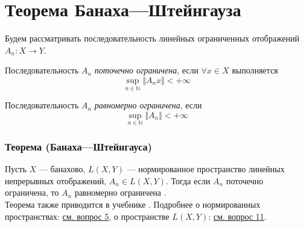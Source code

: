 \section{Теорема Банаха---Штейнгауза}

Будем рассматривать последовательность линейных ограниченных отображений $A_n:X\rightarrow Y$.

Последовательность $A_n$ \textit{поточечно ограничена}, если $\forall x \in X$ выполняется $$ \sup_{n \in \mathbb{N}}\Vert A_nx \Vert < +\infty$$

Последовательность $A_n$ \textit{равномерно ограничена}, если
$$\sup_{n \in \mathbb{N}} \Vert A_n \Vert < +\infty$$

\subsubsection*{Теорема (Банаха---Штейнгауса)}
Пусть $X$ --- банахово, $L(X, Y)$ --- нормированное пространство линейных непрерывных отображений, $A_n \in L(X, Y)$. Тогда если $A_n$ поточечно ограничена, то $A_n$ равномерно ограничена \cite{banach-steingaus}.\\
Теорема также приводится в учебнике \cite[с.~123]{trenogin}. Подробнее о нормированных пространствах: \hyperref[sec:q-5]{см. вопрос 5}, о пространстве $L(X, Y)$: \hyperref[sec:q-11]{см. вопрос 11}.
